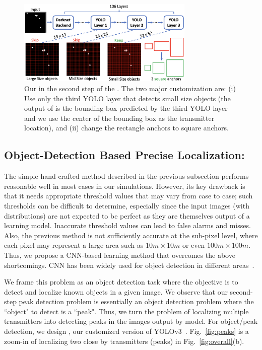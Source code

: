 \begin{figure}
	\centering
	\includegraphics[width=0.75\textwidth]{chapters/wowmom-pmc/figures/yolo.png}
	\vspace{-0.1in}
	\caption{Our \yolocust in the second step of the \our. The two major customization are: (i) Use only the third YOLO layer that detects small size objects (the output of \yolocust is the bounding box predicted by the third YOLO layer and we use the center of the bounding box as the transmitter location), and (ii) change the rectangle anchors to square anchors.}
	\label{fig:yolo}
\end{figure}

\subsection{Object-Detection Based Precise Localization: \yolocust} 

The simple hand-crafted method described in the previous subsection performs reasonable well in most cases in our simulations. 
However, its key drawback is that it needs appropriate threshold values that may vary from case to case; such thresholds can be difficult to determine, especially since
the input images (with distributions) are not expected to be perfect as they are themselves output of a learning model.
Inaccurate threshold values can lead to false alarms and misses. 
Also, the previous method is not sufficiently accurate at the sub-pixel level, where
each pixel may represent a large area such as $10m \times 10m$ or even $100m \times 100m$. Thus,
we propose a CNN-based learning method that overcomes the above shortcomings.  
CNN has been widely used for object detection in different areas~\cite{objectdetectionsurvey,alizadeh21}.

We frame this problem as an object detection task where the objective is to detect and localize
known objects in a given image. We observe that our second-step peak detection problem is essentially an object detection problem where the ``object" to detect is a ``peak".
Thus, we turn the \mtl problem of localizing multiple transmitters into detecting 
peaks in the images output by \imgimg model. 
For object/peak detection, we design \yolocust, our customized version of YOLOv3~\cite{yolov3}.
Fig.~\ref{fig:peaks} is a zoom-in of localizing two close by transmitters (peaks) in Fig.~\ref{fig:overall}(b).

